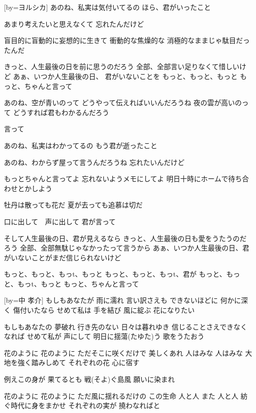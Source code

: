 \documentclass{article}
\newenvironment{Japanese}{%
\CJKfamily{min}%
\CJKtilde
\CJKnospace}{}
\begin{document}
\begin{CJK}{UTF8}{}
\begin{Japanese}
\begin{songs}{}
\endverse
\endsong

[by=ヨルシカ]
\beginverse
あのね、私実は気付いてるの
ほら、君がいったこと

あまり考えたいと思えなくて
忘れたんだけど

盲目的に盲動的に妄想的に生きて
衝動的な焦燥的な
消極的なままじゃ駄目だったんだ

きっと、人生最後の日を前に思うのだろう
全部、全部言い足りなくて惜しいけど
あぁ、いつか人生最後の日、
君がいないことを
もっと、もっと、もっと
もっと、ちゃんと言って

あのね、空が青いのって
どうやって伝えればいいんだろうね
夜の雲が高いのって
どうすれば君もわかるんだろう

言って

あのね、私実はわかってるの
もう君が逝ったこと

あのね、わからず屋って言うんだろうね
忘れたいんだけど

もっとちゃんと言ってよ
忘れないようメモにしてよ
明日十時にホームで待ち合わせとかしよう

牡丹は散っても花だ
夏が去っても追慕は切だ

口に出して　声に出して
君が言って

そして人生最後の日、君が見えるなら
きっと、人生最後の日も愛をうたうのだろう
全部、全部無駄じゃなかったって言うから
あぁ、いつか人生最後の日、君がいないことがまだ信じられないけど

もっと、もっと、もっt、もっと
もっと、もっと、もっt、君が
もっと、もっと、もっt、もっと
もっと、ちゃんと言って

\endverse
\endsong

[by=中 孝介]
\beginverse
もしもあなたが 雨に濡れ
言い訳さえも できないほどに
何かに深く 傷付いたなら
せめて私は 手を結び
風に綻ぶ 花になりたい

もしもあなたの 夢破れ
行き先のない 日々は暮れゆき
信じることさえできなくなれば
せめて私が 声にして
明日に揺蕩(たゆた)う 歌をうたおう

花のように 花のように
ただそこに咲くだけで 美しくあれ
人はみな 人はみな
大地を強く踏みしめて それぞれの花 心に宿す

例えこの身が 果てるとも
戦(そよ)ぐ島風 願いに染まれ

花のように 花のように
ただ風に揺れるだけの この生命
人と人 また 人と人
紡ぐ時代に身をまかせ
それぞれの実が 撓わなればと


\end{songs}
\end{Japanese}
\end{CJK}
\end{document}
